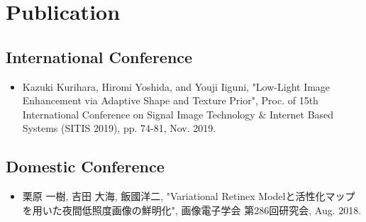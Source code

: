 \chapter*{Publication}
\label{sec:BIO}

\section*{International Conference}
\begin{itemize}
\item
Kazuki Kurihara, Hiromi Yoshida, and Youji Iiguni, 
 "Low-Light Image Enhancement via Adaptive Shape and Texture Prior",
 Proc. of 15th International Conference on Signal Image Technology $\&$ Internet Based Systems (SITIS 2019), pp. 74-81, Nov. 2019. 
\end{itemize}

\section*{Domestic Conference}
\begin{itemize}
\item
栗原 一樹, 吉田 大海, 飯國洋二,
"Variational Retinex Modelと活性化マップを用いた夜間低照度画像の鮮明化",
画像電子学会 第286回研究会, Aug. 2018.
\end{itemize}